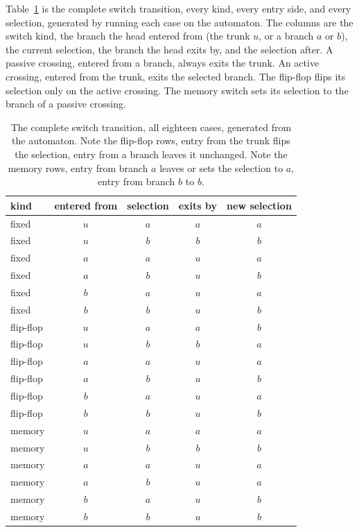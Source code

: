 Table~\ref{tab:enum-switch} is the complete switch transition, every kind, every entry side, and every
selection, generated by running each case on the automaton. The columns are the switch kind, the branch the
head entered from (the trunk $u$, or a branch $a$ or $b$), the current selection, the branch the head exits by,
and the selection after. A passive crossing, entered from a branch, always exits the trunk. An active crossing,
entered from the trunk, exits the selected branch. The flip-flop flips its selection only on the active
crossing. The memory switch sets its selection to the branch of a passive crossing.

\begin{table}[ht]
\centering
\begin{tabular}{@{}lcccc@{}}
\toprule
kind & entered from & selection & exits by & new selection \\
\midrule
fixed & $u$ & $a$ & $a$ & $a$ \\
fixed & $u$ & $b$ & $b$ & $b$ \\
fixed & $a$ & $a$ & $u$ & $a$ \\
fixed & $a$ & $b$ & $u$ & $b$ \\
fixed & $b$ & $a$ & $u$ & $a$ \\
fixed & $b$ & $b$ & $u$ & $b$ \\
\midrule
flip-flop & $u$ & $a$ & $a$ & $b$ \\
flip-flop & $u$ & $b$ & $b$ & $a$ \\
flip-flop & $a$ & $a$ & $u$ & $a$ \\
flip-flop & $a$ & $b$ & $u$ & $b$ \\
flip-flop & $b$ & $a$ & $u$ & $a$ \\
flip-flop & $b$ & $b$ & $u$ & $b$ \\
\midrule
memory & $u$ & $a$ & $a$ & $a$ \\
memory & $u$ & $b$ & $b$ & $b$ \\
memory & $a$ & $a$ & $u$ & $a$ \\
memory & $a$ & $b$ & $u$ & $a$ \\
memory & $b$ & $a$ & $u$ & $b$ \\
memory & $b$ & $b$ & $u$ & $b$ \\
\bottomrule
\end{tabular}
\caption{The complete switch transition, all eighteen cases, generated from the automaton. Note the flip-flop
rows, entry from the trunk flips the selection, entry from a branch leaves it unchanged. Note the memory rows,
entry from branch $a$ leaves or sets the selection to $a$, entry from branch $b$ to $b$.}
\label{tab:enum-switch}
\end{table}

